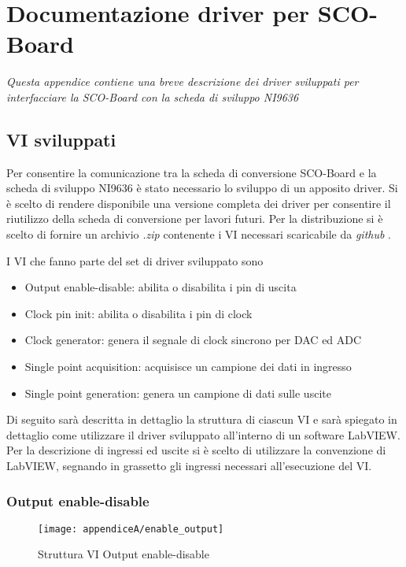 \chapter{Documentazione driver per SCO-Board}
\label{appendiceA}
\thispagestyle{empty}
\textit{Questa appendice contiene una breve descrizione dei driver sviluppati per interfacciare la SCO-Board con la scheda di sviluppo NI9636}

\section*{VI sviluppati}
Per consentire la comunicazione tra la scheda di conversione SCO-Board e la scheda di sviluppo NI9636 è stato necessario lo sviluppo di un apposito driver. Si è scelto di rendere disponibile una versione completa dei driver per consentire il riutilizzo della scheda di conversione per lavori futuri. 
Per la distribuzione si è scelto di fornire un archivio \textit{.zip} contenente i VI necessari scaricabile da \textit{github} \cite{sourceforge}.

I VI che fanno parte del set di driver sviluppato sono
\begin{itemize}
	\item Output enable-disable: abilita o disabilita i pin di uscita
	\item Clock pin init: abilita o disabilita i pin di clock
	\item Clock generator: genera il segnale di clock sincrono per DAC ed ADC
	\item Single point acquisition: acquisisce un campione dei dati in ingresso
	\item Single point generation: genera un campione di dati sulle uscite
\end{itemize}

Di seguito sarà descritta in dettaglio la struttura di ciascun VI e sarà spiegato in dettaglio come utilizzare il driver sviluppato all'interno di un software LabVIEW.
Per la descrizione di ingressi ed uscite si è scelto di utilizzare la convenzione di LabVIEW, segnando in grassetto gli ingressi necessari all'esecuzione del VI.

\subsection*{Output enable-disable}

\begin{figure}[H]
	\begin{center}
		\texttt{[image: appendiceA/enable\_output]}
		\caption{Struttura VI Output enable-disable}
	\end{center}
\end{figure}

